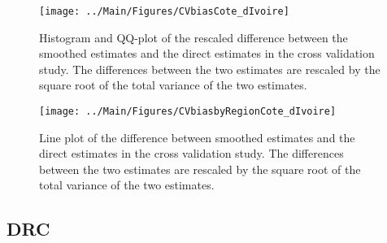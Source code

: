 \documentclass[12pt]{article}\usepackage[]{graphicx}\usepackage[]{color}
\newenvironment{knitrout}{}{} %
\begin{document}
\begin{knitrout}
\color{fgcolor}\begin{figure}[bht]

{\centering \texttt{[image: ../Main/Figures/CVbiasCote\_dIvoire]} 

}

\caption[Histogram and QQ-plot of the rescaled difference between the smoothed estimates and the direct estimates in the cross validation study]{Histogram and QQ-plot of the rescaled difference between the smoothed estimates and the direct estimates in the cross validation study. The differences between the two estimates are rescaled by the square root of the total variance of the two estimates.}\label{fig:unnamed-chunk-89}
\end{figure}


\end{knitrout}

\begin{knitrout}
\color{fgcolor}\begin{figure}[bht]

{\centering \texttt{[image: ../Main/Figures/CVbiasbyRegionCote\_dIvoire]} 

}

\caption[Line plot of the difference between smoothed estimates and the direct estimates in the cross validation study]{Line plot of the difference between smoothed estimates and the direct estimates in the cross validation study. The differences between the two estimates are rescaled by the square root of the total variance of the two estimates.}\label{fig:unnamed-chunk-90}
\end{figure}


\end{knitrout}



\clearpage
\subsection{DRC}


\end{document}
